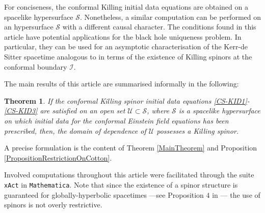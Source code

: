 \documentclass[10pt,a4paper]{article}
\theoremstyle{plain}
\newtheorem*{main}{Theorem}
\begin{document}


   For
   conciseness, the conformal Killing initial data equations are
   obtained on a spacelike hypersurface $\mathcal{S}$. Nonetheless, a
   similar computation can be performed on an hypersurface
   $\mathcal{S}$ with a different causal character.  The conditions
   found in this article have potential applications for the black
   hole uniqueness problem.  In particular, they can be used for an
   asymptotic characterisation of the Kerr-de Sitter spacetime analogous to
   \cite{MarPaeSenSim16} in terms of the existence of Killing spinors at
   the conformal boundary $\mathscr{I}$.

\medskip

The main results of this article are summarised  informally
 in the following:


\begin{main}\label{TheoremSummary}
If the conformal Killing spinor initial data equations
 \eqref{CS-KID1}-\eqref{CS-KID3} are satisfied
on an open set $\mathcal{U}\subset \mathcal{S}$, where
 $\mathcal{S}$ is a spacelike hypersurface on which initial data for 
the conformal Einstein field equations has been prescribed,
 then, the domain of dependence of $\mathcal{U}$  possesses a Killing spinor.
\end{main}

 A precise formulation is the content of Theorem
\ref{MainTheorem} and Proposition \ref{PropositionRestrictionOnCotton}.

\medskip

Involved computations throughout this article were facilitated through
the suite {\tt xAct} in {\tt Mathematica}.
Note that since the existence of a spinor structure is guaranteed for
globally-hyperbolic spacetimes ---see Proposition $4$ in
\cite{CFEbook}--- the use of spinors is not overly restrictive.
\end{document}
